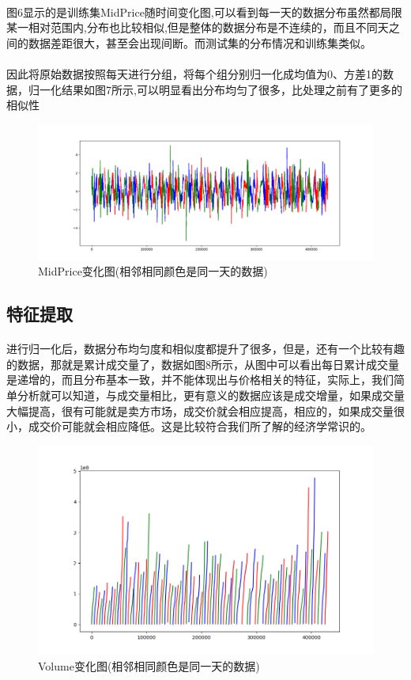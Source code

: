 \documentclass[UTF8]{ctexart}
\begin{document}
\paragraph{}图6显示的是训练集MidPrice随时间变化图,可以看到每一天的数据分布虽然都局限某一相对范围内,分布也比较相似,但是整体的数据分布是不连续的，而且不同天之间的数据差距很大，甚至会出现间断。而测试集的分布情况和训练集类似。
\paragraph{}
因此将原始数据按照每天进行分组，将每个组分别归一化成均值为0、方差1的数据，归一化结果如图7所示,可以明显看出分布均匀了很多，比处理之前有了更多的相似性
\begin{figure}[!htbp]
    \centering
    \includegraphics[scale = 0.4]{p8_2.png}
    \caption{MidPrice变化图(相邻相同颜色是同一天的数据)}
\end{figure}
\subsection{特征提取}
\paragraph{}进行归一化后，数据分布均匀度和相似度都提升了很多，但是，还有一个比较有趣的数据，那就是累计成交量了，数据如图8所示，从图中可以看出每日累计成交量是递增的，而且分布基本一致，并不能体现出与价格相关的特征，实际上，我们简单分析就可以知道，与成交量相比，更有意义的数据应该是成交增量，如果成交量大幅提高，很有可能就是卖方市场，成交价就会相应提高，相应的，如果成交量很小，成交价可能就会相应降低。这是比较符合我们所了解的经济学常识的。
\begin{figure}[!htbp]
    \centering
    \includegraphics[scale = 0.5]{p9.png}
    \caption{Volume变化图(相邻相同颜色是同一天的数据)}
\end{figure}
\end{document}

